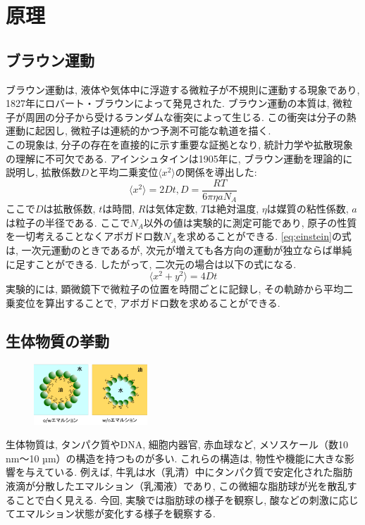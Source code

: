 \documentclass[11pt]{ltjsarticle}
\begin{document}
  \section*{原理}
    \subsection*{ブラウン運動}
      ブラウン運動は, 液体や気体中に浮遊する微粒子が不規則に運動する現象であり, 1827年にロバート・ブラウンによって発見された. ブラウン運動の本質は, 微粒子が周囲の分子から受けるランダムな衝突によって生じる. この衝突は分子の熱運動に起因し, 微粒子は連続的かつ予測不可能な軌道を描く.\\
      この現象は, 分子の存在を直接的に示す重要な証拠となり, 統計力学や拡散現象の理解に不可欠である. アインシュタインは1905年に, ブラウン運動を理論的に説明し, 拡散係数$D$と平均二乗変位$\langle x^2 \rangle$の関係を導出した:
      \begin{equation}
        \langle x^2 \rangle = 2 D t, D = \frac{R T}{6 \pi \eta a N_A}
        \label{eq:einstein}
      \end{equation}
      ここで$D$は拡散係数, $t$は時間, $R$は気体定数, $T$は絶対温度, $\eta$は媒質の粘性係数, $a$は粒子の半径である.
      ここで$N_A$以外の値は実験的に測定可能であり, 原子の性質を一切考えることなくアボガドロ数$N_A$を求めることができる.
      \cref{eq:einstein}の式は, 一次元運動のときであるが, 次元が増えても各方向の運動が独立ならば単純に足すことができる. したがって, 二次元の場合は以下の式になる.
      \begin{equation}
        \langle x^2 + y^2 \rangle = 4 D t
        \label{eq:einstein_2d}
      \end{equation}
      実験的には, 顕微鏡下で微粒子の位置を時間ごとに記録し, その軌跡から平均二乗変位を算出することで, アボガドロ数を求めることができる.
      \newpage
    \subsection*{生体物質の挙動}
      \begin{figure}
        \centering
        \includegraphics[width=0.38\textwidth]{emal.png}
      \end{figure}
      生体物質は, タンパク質やDNA, 細胞内器官, 赤血球など, メソスケール（数10 nm～10 µm）の構造を持つものが多い.
      これらの構造は, 物性や機能に大きな影響を与えている.
      例えば, 牛乳は水（乳清）中にタンパク質で安定化された脂肪液滴が分散したエマルション（乳濁液）であり, この微細な脂肪球が光を散乱することで白く見える.
      今回, 実験では脂肪球の様子を観察し, 酸などの刺激に応じてエマルション状態が変化する様子を観察する.
\end{document}

